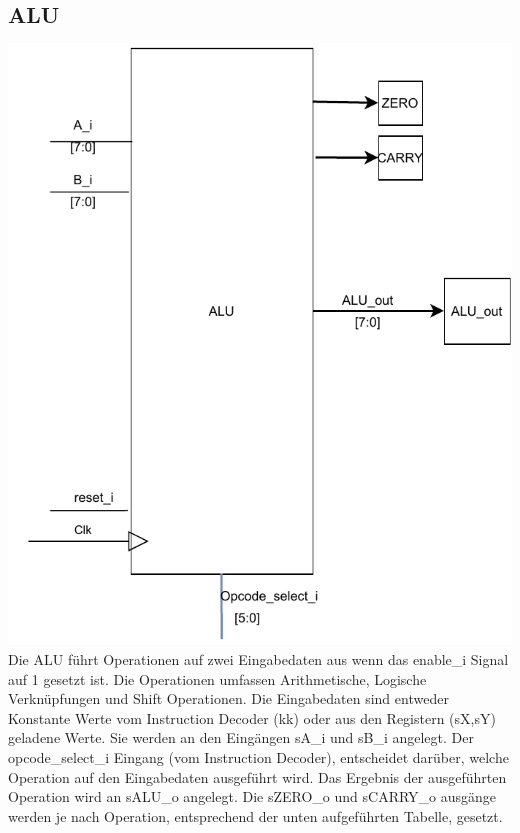 \documentclass{scrartcl}
\begin{document}
\subsection{ALU}
\includegraphics[height=0.5\textheight]{ALU_beschreibung.pdf}\\
Die ALU führt Operationen auf zwei Eingabedaten aus wenn das enable\_i Signal auf 1 gesetzt ist. Die Operationen umfassen Arithmetische, Logische Verknüpfungen und Shift Operationen. Die Eingabedaten sind entweder Konstante Werte vom Instruction Decoder (kk) oder aus den Registern (sX,sY) geladene Werte. Sie werden an den Eingängen sA\_i und sB\_i angelegt. Der opcode\_select\_i Eingang (vom Instruction Decoder), entscheidet darüber, welche Operation auf den Eingabedaten ausgeführt wird. Das Ergebnis der ausgeführten Operation wird an sALU\_o angelegt.
Die sZERO\_o und sCARRY\_o ausgänge werden je nach Operation, entsprechend der unten aufgeführten Tabelle, gesetzt.
\end{document}
